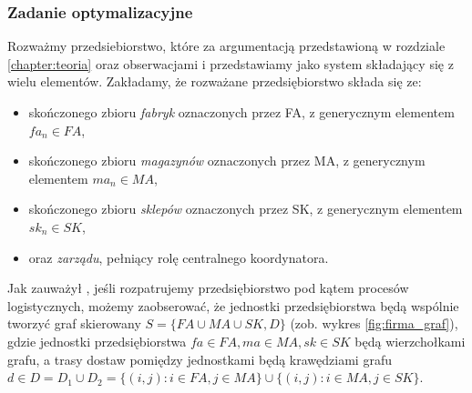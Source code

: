 \documentclass[polish, twoside, 12pt, a4paper]{article}
\theoremstyle{definition}
\theoremstyle{plain}
\theoremstyle{remark}
\begin{document}
\newpage

\subsubsection{Zadanie optymalizacyjne} \label{chapter:zadanie}

Rozważmy przedsiebiorstwo, które za argumentacją przedstawioną w rozdziale \ref{chapter:teoria} oraz obserwacjami  \cite{Moyaux2006} i \cite{Kawa2010} przedstawiamy jako system składający się z wielu elementów. Zakładamy, że rozważane przedsiębiorstwo składa się ze:
	\begin{itemize} 
		\item skończonego zbioru \textit{fabryk} oznaczonych przez FA, z generycznym elementem $fa_n \in FA$,
		\item skończonego zbioru \textit{magazynów} oznaczonych przez MA, z generycznym elementem $ma_n \in MA$,
		\item skończonego zbioru \textit{sklepów} oznaczonych przez SK, z generycznym elementem $sk_n \in SK$,
		\item oraz \textit{zarządu}, pełniący rolę centralnego koordynatora.
	\end{itemize}

Jak zauważył \cite{Kawa2010}, jeśli rozpatrujemy przedsiębiorstwo pod kątem procesów logistycznych, możemy zaobserować, że jednostki przedsiębiorstwa będą wspólnie tworzyć graf skierowany $S = \{FA \cup MA \cup SK, D\}$ (zob. wykres \ref{fig:firma_graf}), gdzie jednostki przedsiębiorstwa $fa \in FA, ma \in MA, sk \in SK$ będą wierzchołkami grafu, a trasy dostaw pomiędzy jednostkami będą krawędziami grafu  $d \in D = D_1 \cup D_2 = \{(i,j) : i \in FA, j \in MA\} \cup \{(i,j) : i \in MA, j \in SK\}$. 
\end{document}
